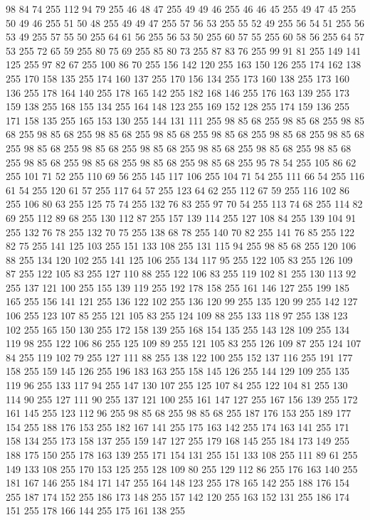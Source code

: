 98 84 74 255 112 94 79 255 46 48 47 255 49 49 46 255 46 46 45 255 49 47 45 255 50 49 46 255 51 50 48 255 49 49 47 255 57 56 53 255 55 52 49 255 56 54 51 255 56 53 49 255 57 55 50 255 64 61 56 255 56 53 50 255 60 57 55 255 60 58 56 255 64 57 53 255 72 65 59 255 80 75 69 255 85 80 73 255 87 83 76 255 99 91 81 255 149 141 125 255 97 82 67 255 100 86 70 255 156 142 120 255 163 150 126 255 174 162 138 255 170 158 135 255 174 160 137 255 170 156 134 255 173 160 138 255 173 160 136 255 178 164 140 255 178 165 142 255 182 168 146 255 176 163 139 255 173 159 138 255 168 155 134 255 164 148 123 255 169 152 128 255 174 159 136 255 171 158 135 255 165 153 130 255 144 131 111 255 98 85 68 255 98 85 68 255 98 85 68 255 98 85 68 255 98 85 68 255 98 85 68 255 98 85 68 255 98 85 68 255 98 85 68 255 98 85 68 255 98 85 68 255 98 85 68 255 98 85 68 255 98 85 68 255 98 85 68 255 98 85 68 255 98 85 68 255
98 85 68 255 98 85 68 255 95 78 54 255 105 86 62 255 101 71 52 255 110 69 56 255 145 117 106 255 104 71 54 255 111 66 54 255 116 61 54 255 120 61 57 255 117 64 57 255 123 64 62 255 112 67 59 255 116 102 86 255 106 80 63 255 125 75 74 255 132 76 83 255 97 70 54 255 113 74 68 255 114 82 69 255 112 89 68 255 130 112 87 255 157 139 114 255 127 108 84 255 139 104 91 255 132 76 78 255 132 70 75 255 138 68 78 255 140 70 82 255 141 76 85 255 122 82 75 255 141 125 103 255 151 133 108 255 131 115 94 255 98 85 68 255 120 106 88 255 134 120 102 255 141 125 106 255 134 117 95 255 122 105 83 255 126 109 87 255 122 105 83 255 127 110 88 255 122 106 83 255 119 102 81 255 130 113 92 255 137 121 100 255 155 139 119 255 192 178 158 255 161 146 127 255 199 185 165 255 156 141 121 255 136 122 102 255 136 120 99 255 135 120 99 255 142 127 106 255 123 107 85 255 121 105 83 255 124 109 88 255 133 118 97 255 138 123 102 255 165 150 130 255 172 158 139 255
168 154 135 255 143 128 109 255 134 119 98 255 122 106 86 255 125 109 89 255 121 105 83 255 126 109 87 255 124 107 84 255 119 102 79 255 127 111 88 255 138 122 100 255 152 137 116 255 191 177 158 255 159 145 126 255 196 183 163 255 158 145 126 255 144 129 109 255 135 119 96 255 133 117 94 255 147 130 107 255 125 107 84 255 122 104 81 255 130 114 90 255 127 111 90 255 137 121 100 255 161 147 127 255 167 156 139 255 172 161 145 255 123 112 96 255 98 85 68 255 98 85 68 255 187 176 153 255 189 177 154 255 188 176 153 255 182 167 141 255 175 163 142 255 174 163 141 255 171 158 134 255 173 158 137 255 159 147 127 255 179 168 145 255 184 173 149 255 188 175 150 255 178 163 139 255 171 154 131 255 151 133 108 255 111 89 61 255 149 133 108 255 170 153 125 255 128 109 80 255 129 112 86 255 176 163 140 255 181 167 146 255 184 171 147 255 164 148 123 255 178 165 142 255 188 176 154 255 187 174 152 255 186 173 148 255 157 142 120 255 163 152 131 255 186 174 151 255 178 166 144 255 175 161 138 255
